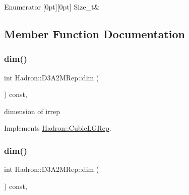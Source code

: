 \begin{DoxyEnumFields}{Enumerator}
[0pt][0pt]{}\mbox{\label{structHadron_1_1D3A2MRep_ab9251d3f86eb3f8db7acb912eda91ff3a164d3e97df3559ada68314d124d6bd97}} 
Size\+\_\+t&\\
\hline

\end{DoxyEnumFields}


\subsection{Member Function Documentation}
\mbox{\label{structHadron_1_1D3A2MRep_ae911a1abb0e401263bce94ba89ac6142}} 
\subsubsection{\texorpdfstring{dim()}{dim()}\hspace{0.1cm}{\footnotesize\ttfamily [1/3]}}
{\footnotesize\ttfamily int Hadron\+::\+D3\+A2\+M\+Rep\+::dim (\begin{DoxyParamCaption}{ }\end{DoxyParamCaption}) const\hspace{0.3cm}{\ttfamily [inline]}, {\ttfamily [virtual]}}

dimension of irrep 

Implements \mbox{\hyperlink{structHadron_1_1CubicLGRep_a3acbaea26503ed64f20df693a48e4cdd}{Hadron\+::\+Cubic\+L\+G\+Rep}}.

\mbox{\label{structHadron_1_1D3A2MRep_ae911a1abb0e401263bce94ba89ac6142}} 
\subsubsection{\texorpdfstring{dim()}{dim()}\hspace{0.1cm}{\footnotesize\ttfamily [2/3]}}
{\footnotesize\ttfamily int Hadron\+::\+D3\+A2\+M\+Rep\+::dim (\begin{DoxyParamCaption}{ }\end{DoxyParamCaption}) const\hspace{0.3cm}{\ttfamily [inline]}, {\ttfamily [virtual]}}

